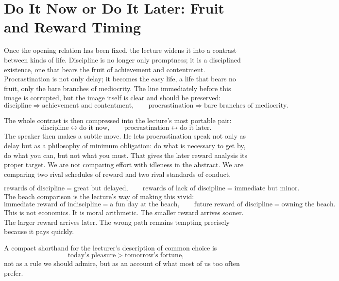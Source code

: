 \section{Do It Now or Do It Later: Fruit and Reward Timing}

Once the opening relation has been fixed, the lecture widens it into a contrast between kinds of life. Discipline is no longer only promptness; it is a disciplined existence, one that bears the fruit of achievement and contentment. Procrastination is not only delay; it becomes the easy life, a life that bears no fruit, only the bare branches of mediocrity. The line immediately before this image is corrupted, but the image itself is clear and should be preserved:
\begin{equation}
\text{discipline} \Rightarrow \text{achievement and contentment}, \qquad
\text{procrastination} \Rightarrow \text{bare branches of mediocrity}.
\end{equation}

The whole contrast is then compressed into the lecture's most portable pair:
\begin{equation}
\text{discipline} \leftrightarrow \text{do it now}, \qquad
\text{procrastination} \leftrightarrow \text{do it later}.
\end{equation}
The speaker then makes a subtle move. He lets procrastination speak not only as delay but as a philosophy of minimum obligation: do what is necessary to get by, do what you can, but not what you must. That gives the later reward analysis its proper target. We are not comparing effort with idleness in the abstract. We are comparing two rival schedules of reward and two rival standards of conduct.

\begin{equation}
\text{rewards of discipline} = \text{great but delayed}, \qquad
\text{rewards of lack of discipline} = \text{immediate but minor}.
\end{equation}
The beach comparison is the lecture's way of making this vivid:
\begin{equation}
\text{immediate reward of indiscipline} = \text{a fun day at the beach}, \qquad
\text{future reward of discipline} = \text{owning the beach}.
\end{equation}
This is not economics. It is moral arithmetic. The smaller reward arrives sooner. The larger reward arrives later. The wrong path remains tempting precisely because it pays quickly.

A compact shorthand for the lecturer's description of common choice is
\begin{equation}
\text{today's pleasure} > \text{tomorrow's fortune},
\end{equation}
not as a rule we should admire, but as an account of what most of us too often prefer.

